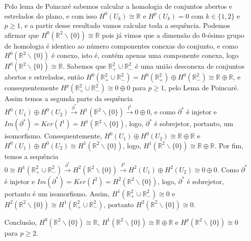 \documentclass{article}
\begin{document}
	Pelo lema de Poincaré sabemos calcular a homologia de conjuntos abertos e estrelados do plano, e com isso $H^{0}(U_{k}) \cong \mathbb{R}$ e $H^{p}(U_{k}) = 0$ com $k \in \{1,2\}$ e $p\geq 1$, e a partir desse resultado vamos calcular toda a sequência. Podemos afirmar que $H^{0}(\mathbb{R}^{2} \backslash \{0\}) \cong \mathbb{R}$ pois já vimos que a dimensão do 0-ésimo grupo de homologia é identico ao número componentes conexas do conjunto, e como $H^{0}(\mathbb{R}^{2} \backslash \{0\} )$ é conexo, isto é, contém apenas uma componente conexa, logo $H^{0}(\mathbb{R}^{2} \backslash \{0\}) \cong \mathbb{R}$. Sabemos que $\mathbb{R}^{2}_{+} \cup \mathbb{R}^{2}_{-}$ é uma união desconexa de conjuntos abertos e estrelados, então $H^{0}(\mathbb{R}^{2}_{+} \cup \mathbb{R}^{2}_{-}) =  H^{0}(\mathbb{R}^{2}_{+}) \oplus H^{0}(\mathbb{R}^{2}_{-})\cong \mathbb{R} \oplus \mathbb{R}$, e consequentemente $H^{p}(\mathbb{R}^{2}_{+} \cup \mathbb{R}^{2}_{-}) \cong 0\oplus 0$ para $p\geq 1$, pelo Lema de Poincaré. Assim temos a segunda parte da sequência $H^{0}(U_{1}) \oplus H^{0}(U_{2})  \xrightarrow{\partial^{*}} H^{1}(\mathbb{R}^{2} \backslash \{0\} ) \xrightarrow{I^{1}} 0 \oplus 0 $, e como $\partial^{*}$ é injetor e $Im(\partial^{*}) = Ker(I^{1}) = H^{1}(\mathbb{R}^{2} \backslash \{0\})$, logo, $\partial^{*}$ é sobrejetor, portanto, um isomorfismo. Consequentemente, $H^{0}(U_{1}) \oplus H^{0}(U_{2}) \cong \mathbb{R} \oplus \mathbb{R}$ e $ H^{0}(U_{1}) \oplus H^{0}(U_{2}) \cong H^{1}(\mathbb{R}^{2} \backslash \{0\} ) $, logo, $H^{1}(\mathbb{R}^{2} \backslash \{0\} ) \cong \mathbb{R} \oplus \mathbb{R}$. Por fim, temos a sequência $0 \cong H^{1}(\mathbb{R}^{2}_{+} \cup \mathbb{R}^{2}_{-})\xrightarrow{\partial^{*}} H^{2}(\mathbb{R}^{2} \backslash \{0\} ) \xrightarrow{I^{2}} H^{2}(U_{1}) \oplus H^{2}(U_{2}) \cong 0 \oplus 0$. Como $\partial^{*}$ é injetor e $Im(\partial^{*}) = Ker(I^{2}) = H^{2}(\mathbb{R}^{2} \backslash \{0\} )$, logo, $\partial^{*}$ é sobrejetor, portanto é um isomorfismo. Assim, $ H^{1}(\mathbb{R}^{2}_{+} \cup \mathbb{R}^{2}_{-}) \cong 0$ e $H^{2}(\mathbb{R}^{2} \backslash \{0\} ) \cong H^{1}(\mathbb{R}^{2}_{+} \cup \mathbb{R}^{2}_{-})$, portanto $H^{2}(\mathbb{R}^{2} \backslash \{0\} ) \cong 0$.
	
	Conclusão, $H^{0}(\mathbb{R}^{2} \backslash \{0\}) \cong \mathbb{R}$, $H^{1}(\mathbb{R}^{2} \backslash \{0\}) \cong \mathbb{R} \oplus \mathbb{R}$ e  $H^{p}(\mathbb{R}^{2} \backslash \{0\}) \cong 0$ para $p \geq 2$.
\end{document}
